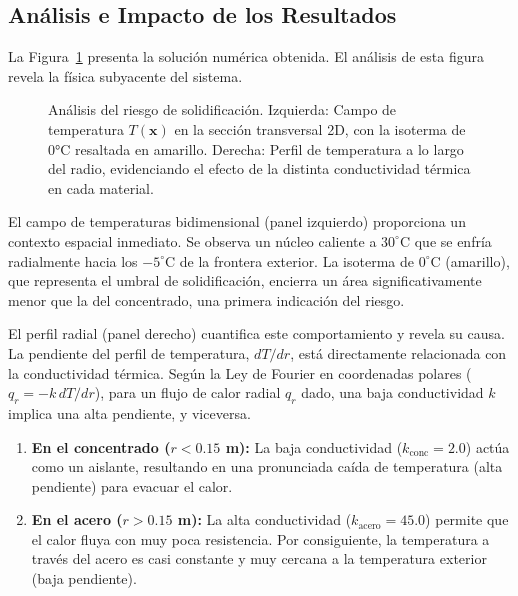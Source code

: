 \subsection{Análisis e Impacto de los Resultados}

La Figura~\ref{fig:poisson-pipe-result} presenta la solución numérica obtenida. El análisis de esta figura revela la física subyacente del sistema.

\begin{figure}[h!]
    \centering
    \caption{Análisis del riesgo de solidificación. Izquierda: Campo de temperatura \(T(\bm{x})\) en la sección transversal 2D, con la isoterma de 0°C resaltada en amarillo. Derecha: Perfil de temperatura a lo largo del radio, evidenciando el efecto de la distinta conductividad térmica en cada material.}
    \label{fig:poisson-pipe-result}
\end{figure}

El campo de temperaturas bidimensional (panel izquierdo) proporciona un contexto espacial inmediato. Se observa un núcleo caliente a \(30^\circ\text{C}\) que se enfría radialmente hacia los \(-5^\circ\text{C}\) de la frontera exterior. La isoterma de \(0^\circ\text{C}\) (amarillo), que representa el umbral de solidificación, encierra un área significativamente menor que la del concentrado, una primera indicación del riesgo.

El perfil radial (panel derecho) cuantifica este comportamiento y revela su causa. La pendiente del perfil de temperatura, \(dT/dr\), está directamente relacionada con la conductividad térmica. Según la Ley de Fourier en coordenadas polares (\(q_r = -k \, dT/dr\)), para un flujo de calor radial \(q_r\) dado, una baja conductividad \(k\) implica una alta pendiente, y viceversa.
\begin{enumerate}
    \item \textbf{En el concentrado (\(r < 0.15\) m):} La baja conductividad (\(k_{\text{conc}} = 2.0\)) actúa como un aislante, resultando en una pronunciada caída de temperatura (alta pendiente) para evacuar el calor.
    \item \textbf{En el acero (\(r > 0.15\) m):} La alta conductividad (\(k_{\text{acero}} = 45.0\)) permite que el calor fluya con muy poca resistencia. Por consiguiente, la temperatura a través del acero es casi constante y muy cercana a la temperatura exterior (baja pendiente).
\end{enumerate}

